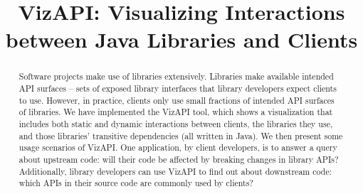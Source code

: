 \documentclass[conference]{IEEEtran}
\begin{document}
\title{VizAPI: Visualizing Interactions between Java Libraries and Clients}




\author{
}
\maketitle

\begin{abstract}
Software projects make use of libraries extensively. Libraries make available intended API surfaces -- sets of exposed library interfaces that library developers expect clients to use. However, in practice, clients only use small fractions of intended API surfaces of libraries. We have implemented the VizAPI tool, which shows a visualization that includes both static and dynamic interactions between clients, the libraries they use, and  those libraries’ transitive dependencies (all written in Java). We then present some usage scenarios of VizAPI. One application, by client developers, is to answer a query about upstream code: will their code be affected by breaking changes in library APIs? Additionally, library developers can use VizAPI to find out about downstream code: which APIs in their source code are commonly used by clients? 
\end{abstract}
\end{document}
